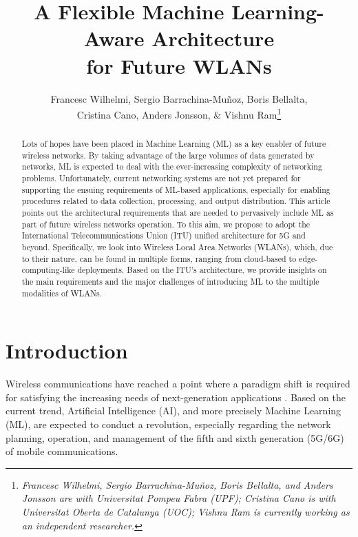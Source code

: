 \documentclass[twocolumn]{article}
\date{}
\begin{document}
\title{A Flexible Machine Learning-Aware Architecture\\ for Future WLANs} 

\author{Francesc Wilhelmi, Sergio Barrachina-Mu\~noz, Boris Bellalta,\\ Cristina Cano, Anders Jonsson,  \& Vishnu Ram\thanks{\textit{Francesc Wilhelmi, Sergio Barrachina-Mu\~noz, Boris Bellalta, and Anders Jonsson are with Universitat Pompeu Fabra (UPF); Cristina Cano is with Universitat Oberta de Catalunya (UOC); Vishnu Ram is currently working as an independent researcher.}}}

\maketitle

\begin{abstract} 
Lots of hopes have been placed in Machine Learning (ML) as a key enabler of future wireless networks. By taking advantage of the large volumes of data generated by networks, ML is expected to deal with the ever-increasing complexity of networking problems. Unfortunately, current networking systems are not yet prepared for supporting the ensuing requirements of ML-based applications, especially for enabling procedures related to data collection, processing, and output distribution. This article points out the architectural requirements that are needed to pervasively include ML as part of future wireless networks operation. To this aim, we propose to adopt the International Telecommunications Union (ITU) unified architecture for 5G and beyond. Specifically, we look into Wireless Local Area Networks (WLANs), which, due to their nature, can be found in multiple forms, ranging from cloud-based to edge-computing-like deployments. Based on the ITU's architecture, we provide insights on the main requirements and the major challenges of introducing ML to the multiple modalities of WLANs.
\end{abstract}

\section{Introduction} 
\label{section:introduction}
Wireless communications have reached a point where a paradigm shift is required for satisfying the increasing needs of next-generation applications \cite{osseiran2014scenarios}. Based on the current trend, Artificial Intelligence (AI), and more precisely Machine Learning (ML), are expected to conduct a revolution, especially regarding the network planning, operation, and management of the fifth and sixth generation (5G/6G) of mobile communications. 
\end{document}
